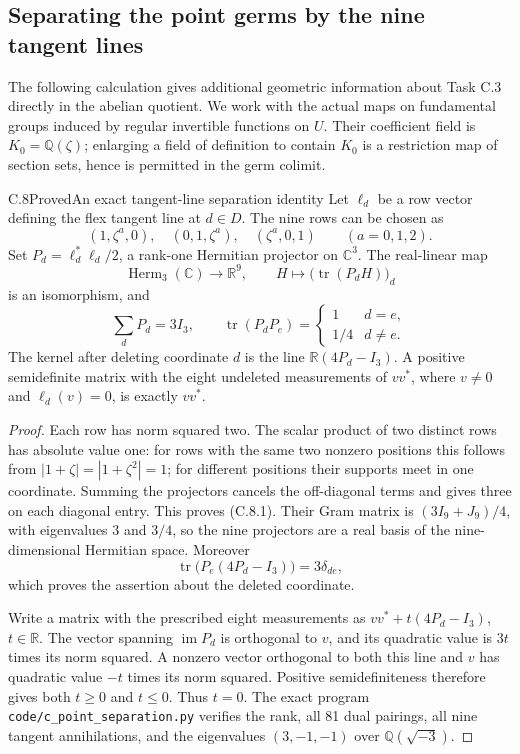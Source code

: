 \subsection{Separating the point germs by the nine tangent lines}

The following calculation gives additional geometric information about
Task C.3 directly in the abelian quotient. We work with the actual maps
on fundamental groups induced by regular invertible functions on $U$.
Their coefficient field is $K_0=\mathbb Q(\zeta)$; enlarging a field of
definition to contain $K_0$ is a restriction map of section sets, hence
is permitted in the germ colimit.

\begin{statement}{C.8}{Proved}{An exact tangent-line separation identity}
Let $\ell_d$ be a row vector defining the flex tangent line at $d\in D$.
The nine rows can be chosen as
\[
 (1,\zeta^a,0),\quad(0,1,\zeta^a),\quad(\zeta^a,0,1)
 \qquad (a=0,1,2).
\]
Set $P_d=\ell_d^*\ell_d/2$, a rank-one Hermitian projector on
$\mathbb C^3$. The real-linear map
\[
 \operatorname{Herm}_3(\mathbb C)\longrightarrow\mathbb R^9,
 \qquad H\longmapsto\bigl(\operatorname{tr}(P_d H)\bigr)_d
\]
is an isomorphism, and
\[
 \sum_d P_d=3I_3,\qquad
 \operatorname{tr}(P_dP_e)=
 \begin{cases}1&d=e,\\1/4&d\ne e.\end{cases}
 \tag{C.8.1}
\]
The kernel after deleting coordinate $d$ is the line
$\mathbb R(4P_d-I_3)$. A positive semidefinite matrix with the
eight undeleted measurements of $vv^*$, where $v\ne0$ and
$\ell_d(v)=0$, is exactly $vv^*$.
\end{statement}
\begin{proof}
Each row has norm squared two. The scalar product of two distinct
rows has absolute value one: for rows with the same two nonzero
positions this follows from $|1+\zeta|=|1+\zeta^2|=1$; for
different positions their supports meet in one coordinate.
Summing the projectors cancels the off-diagonal terms and gives
three on each diagonal entry. This proves (C.8.1). Their Gram
matrix is $(3I_9+J_9)/4$, with eigenvalues $3$ and $3/4$, so the
nine projectors are a real basis of the nine-dimensional
Hermitian space. Moreover
\[
 \operatorname{tr}\bigl(P_e(4P_d-I_3)\bigr)=3\delta_{de},
\]
which proves the assertion about the deleted coordinate.

Write a matrix with the prescribed eight measurements as
$vv^*+t(4P_d-I_3)$, $t\in\mathbb R$. The vector spanning
$\operatorname{im}P_d$ is orthogonal to $v$, and its quadratic
value is $3t$ times its norm squared. A nonzero vector orthogonal
to both this line and $v$ has quadratic value $-t$ times its
norm squared. Positive semidefiniteness therefore gives both
$t\ge0$ and $t\le0$. Thus $t=0$.
The exact program \texttt{code/c\_point\_separation.py} verifies
the rank, all 81 dual pairings, all nine tangent annihilations,
and the eigenvalues $(3,-1,-1)$ over $\mathbb Q(\sqrt{-3})$.
\end{proof}

